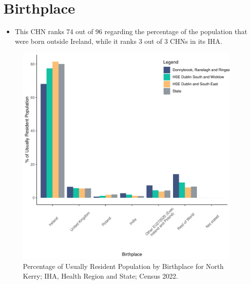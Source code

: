\documentclass{article}
\begin{document}
\section{Birthplace}\label{sect:Birth}
\begin{itemize}
\item This CHN ranks  74 out of 96 regarding the percentage of the population that were born outside Ireland, while it ranks  3 out of 3 CHNs in its IHA.
\end{itemize}
\begin{figure}[H]
	\centering
	\includegraphics[width = 130mm]{../figures/BirthED.pdf}
	\caption{Percentage of Usually Resident Population by Birthplace for North Kerry; IHA, Health Region and State; Census 2022.}
	\label{fig:vbnv}
	\end{figure}
	
\end{document}
